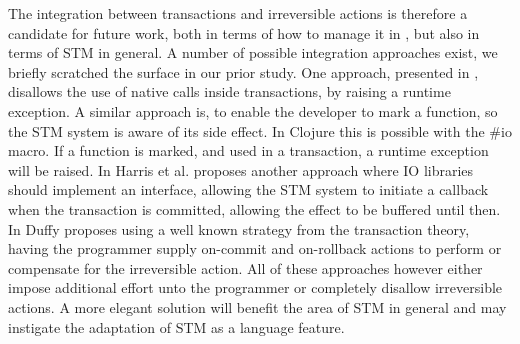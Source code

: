 The integration between transactions and irreversible actions is therefore a candidate for future work, both in terms of how to manage it in \stmname, but also in terms of \ac{STM} in general. A number of possible integration approaches exist, we briefly scratched the surface in our prior study\cite[p. 51-52]{dpt907e14trending}. One approach, presented in \cite[p. 4]{harris2003language}, disallows the use of native calls inside transactions, by raising a runtime exception. A similar approach is, to enable the developer to mark a function, so the \ac{STM} system is aware of its side effect. In Clojure this is possible with the \#io macro. If a function is marked, and used in a transaction, a runtime exception will be raised. In \cite{harris2005exceptions} Harris et al. proposes another approach where \ac{IO} libraries should implement an interface, allowing the \ac{STM} system to initiate a callback when the transaction is committed, allowing the effect to be buffered until then. In \cite{duffy2010stmnet} Duffy proposes using a well known strategy from the transaction theory\cite{reuter1993transaction}, having the programmer supply on-commit and on-rollback actions to perform or compensate for the irreversible action. All of these approaches however either impose additional effort unto the programmer or completely disallow irreversible actions. A more elegant solution will benefit the area of \ac{STM} in general and may instigate the adaptation of \ac{STM} as a language feature.
\worksheetend